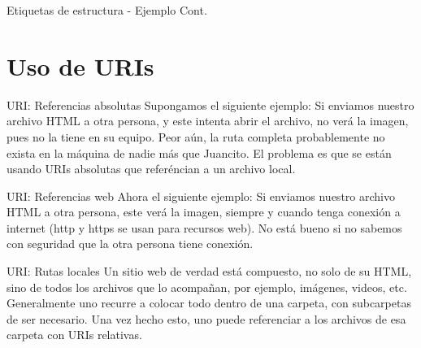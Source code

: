 
\begin{frame}[fragile]{Etiquetas de estructura - Ejemplo Cont.}
\end{frame}


\section{Uso de URIs}


\begin{frame}[fragile]{URI: Referencias absolutas}
	Supongamos el siguiente ejemplo:
	\jump
	\jump
	Si enviamos nuestro archivo HTML a otra persona, y este intenta abrir el
	archivo, no verá la imagen, pues no la tiene en su equipo.
	\jump
	Peor aún, la ruta completa probablemente no exista en la máquina de nadie más
	que Juancito.
	\jump
	El problema es que se están usando URIs absolutas que referéncian a un archivo
	local.
\end{frame}


\begin{frame}[fragile]{URI: Referencias web}
	Ahora el siguiente ejemplo:
	\jump
	\jump
	Si enviamos nuestro archivo HTML a otra persona, este verá la imagen,
	siempre y cuando tenga conexión a internet (http y https se usan para recursos
	web).
	\jump
	No está bueno si no sabemos con seguridad que la otra persona tiene conexión.
\end{frame}


\begin{frame}[fragile]{URI: Rutas locales}
	Un sitio web de verdad está compuesto, no solo de su HTML, sino de todos
	los archivos que lo acompañan, por ejemplo, imágenes, videos, etc.
	\jump
	Generalmente uno recurre a colocar todo dentro de una carpeta, con subcarpetas
	de ser necesario. Una vez hecho esto, uno puede referenciar a los archivos de
	esa carpeta con URIs relativas.
\end{frame}

